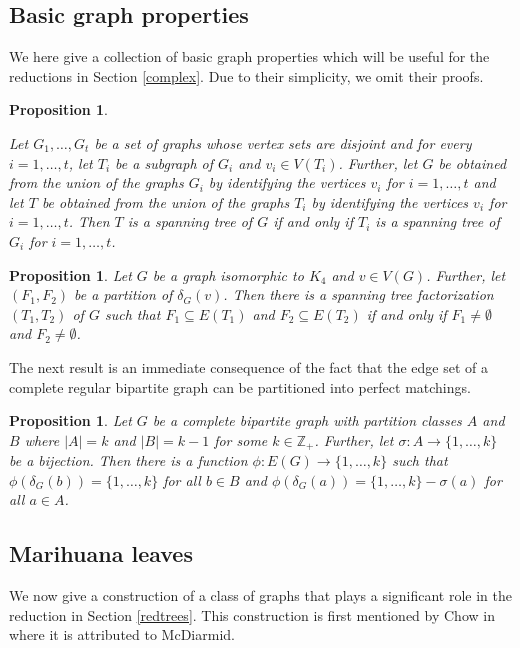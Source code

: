 \documentclass{article}
\newtheorem{Proposition}[Statement]{Proposition}
\begin{document}
\subsection{Basic graph properties}\label{bas}
We here give a collection of basic graph properties which will be useful for the reductions in Section \ref{complex}. Due to their simplicity, we omit their proofs.
\begin{Proposition}\label{ident}

Let $G_1,\ldots,G_t$ be a set of graphs whose vertex sets are disjoint and for every $i=1,\ldots,t$, let $T_i$ be a subgraph of $G_i$ and $v_i \in V(T_i)$. Further, let $G$ be obtained from the union of the graphs $G_i$ by identifying the vertices $v_i$ for $i=1,\ldots,t$ and let $T$ be obtained from the union of the graphs $T_i$ by identifying the vertices $v_i$ for $i=1,\ldots,t$. Then $T$ is a spanning tree of $G$ if and only if $T_i$ is  a spanning tree of $G_i$ for $i=1,\ldots,t$.
\end{Proposition}
\begin{Proposition}\label{fzf}
Let $G$ be a graph isomorphic to $K_4$ and $v \in V(G)$. Further, let $(F_1,F_2)$ be a partition of $\delta_G(v)$. Then there is a spanning tree factorization $(T_1,T_2)$ of $G$ such that $F_1 \subseteq E(T_1)$ and $F_2 \subseteq E(T_2)$ if and only if $F_1 \neq \emptyset$ and $F_2 \neq \emptyset$.
\end{Proposition}
The next result is an immediate consequence of the fact that the edge set of a complete regular bipartite graph can be partitioned into perfect matchings.
\begin{Proposition}\label{compbip}
Let $G$ be a complete bipartite graph with partition classes $A$ and $B$ where $|A|=k$ and $|B|=k-1$ for some $k \in \mathbb{Z}_+$. Further, let $\sigma:A \rightarrow \{1,\ldots,k\}$ be a bijection. Then there is a function $\phi:E(G)\rightarrow \{1,\ldots,k\}$ such that $\phi(\delta_{G}(b))=\{1,\ldots,k\}$ for all $b \in B$ and $\phi(\delta_{G}(a))=\{1,\ldots,k\}-\sigma(a)$ for all $a \in A$.
\end{Proposition}
\subsection{Marihuana leaves}\label{weed}


We now give a construction of a class of graphs that plays a significant role in the reduction in Section \ref{redtrees}. This construction is first mentioned by Chow in \cite{chow} where it is attributed to McDiarmid.
\end{document}
